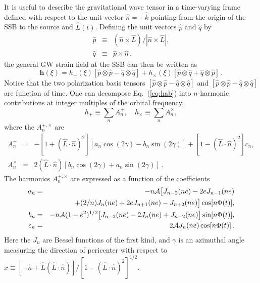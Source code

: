 \documentclass[12pt]{iopart}
\def\be{\begin{equation}}
\def\ee{\end{equation}}
\begin{document}
It is useful to describe the gravitational wave tensor in a time-varying frame defined with respect to the unit vector ${\hat n} = -{\hat k}$ pointing from the origin of the SSB to the source and ${ \hat L}(t)$. Defining the unit vectors 
${ \hat p}$ and ${ \hat q}$ by
\begin{eqnarray} \label{pq}
{ \hat p} &\equiv& ({ \hat n}\times { \hat L})/
                    |{ \hat n}\times { \hat L}|, \nonumber\\
{ \hat q} &\equiv& { \hat p} \times { \hat n}\,,
\end{eqnarray}
the general GW strain field at the SSB can then be written as
%
\begin{equation}
\label{eq:hab}
\mathbf{h}(\xi) = h_{+}(\xi) \left[ \hat{p}\otimes \hat{p} - \hat{q}\otimes \hat{q} \right] + h_{\times}(\xi) \left[ \hat{p}\otimes \hat{q} + \hat{q}\otimes \hat{p} \right]\,.
\end{equation}
%
Notice that the two polarization basis tensors $[ \hat{p}\otimes \hat{p} - \hat{q}\otimes \hat{q}]$  and $[ \hat{p}\otimes \hat{p} - \hat{q}\otimes \hat{q}]$ are function of time. 
One can decompose Eq.\ (\ref{eq:hab}) into $n$-harmonic contributions at integer multiples of the orbital frequency,
\be
h_{+}\equiv \sum_n A^{+}_n, \quad h_{\times}\equiv \sum_n A^{\times}_n,
\label{harmonics}
\ee
where the $A^{+,\times}_n$ are
\begin{eqnarray} \label{A}
A^{+}_n &=&-[1+({ \hat L}\cdot{ \hat n})^2]\left[
a_n\cos(2\gamma)-b_n\sin(2\gamma)\right]
+[1-({ \hat L}\cdot{ \hat n})^2]c_n, \nonumber\\
A^{\times}_n&=& 2({ \hat L}\cdot{ \hat n})\left[
b_n \cos(2\gamma)+a_n \sin(2\gamma)\right]\,.
\end{eqnarray}
The harmonics $A^{+,\times}_n$ are expressed as a function of the coefficients
\begin{eqnarray} \label{abc}
a_n &=& - n{\cal A}\bigl[J_{n-2}(ne)-2eJ_{n-1}(ne) \nonumber \\
       && +(2/n)J_n(ne) +2eJ_{n+1}(ne)-J_{n+2}(ne)\bigr]\cos[n\Phi(t)],
\nonumber\\
b_n &=& - n{\cal A}(1-e^2)^{1/2}\bigl[J_{n-2}(ne)-2J_{n}(ne)
+J_{n+2}(ne)\bigr]\sin[n \Phi(t)],
\nonumber\\
c_n &=& 2{\cal A}J_n(ne)\cos[n\Phi(t)]\,.
\end{eqnarray}
Here the $J_n$ are Bessel functions of the first kind, and $\gamma$ is an azimuthal angle measuring the direction of pericenter with respect to $\hat x \equiv [-\hat n + \hat L (\hat L\cdot \hat n)]/[1-(\hat L\cdot \hat n)^2]^{1/2}$.
\end{document}
